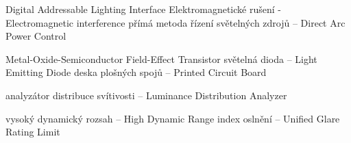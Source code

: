 


  {Digital Addressable Lighting Interface}
  {Elektromagnetické rušení - Electromagnetic interference}
 {přímá metoda řízení světelných zdrojů -- Direct Arc Power Control}

 {Metal-Oxide-Semiconductor Field-Effect Transistor}
    {světelná dioda -- Light Emitting Diode}
    {deska plošných spojů -- Printed Circuit Board}

    {analyzátor distribuce svítivosti -- Luminance Distribution Analyzer}

    {vysoký dynamický rozsah -- High Dynamic Range}
   {index oslnění -- Unified Glare Rating Limit}